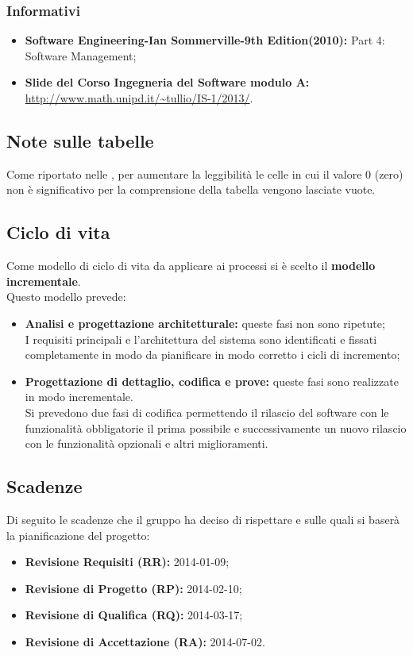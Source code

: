 		\subsubsection{Informativi}
		\label{RifInformativi}
			\begin{itemize}
				\item \textbf{Software Engineering-Ian Sommerville-9th Edition(2010):} Part 4: Software Management;
				
				\item \textbf{Slide del Corso Ingegneria del Software modulo A:} \url{http://www.math.unipd.it/~tullio/IS-1/2013/}.
			\end{itemize}
	\subsection{Note sulle tabelle}
	\label{NoteSulleTabelle}
		Come riportato nelle \NdP, per aumentare la leggibilità le celle in cui il valore 0 (zero) non è significativo per la comprensione della tabella vengono lasciate vuote.
	
	\subsection{Ciclo di vita}
	\label{CicloDiVita}
		Come modello di ciclo di vita da applicare ai processi si è scelto il \textbf{modello incrementale}.\\
		Questo modello prevede:
		\begin{itemize}
			\item \textbf{Analisi e progettazione architetturale:} queste fasi non sono ripetute;\\
			I requisiti principali e l'architettura del sistema sono identificati e fissati completamente in modo da pianificare in modo corretto i cicli di incremento;
			
			\item \textbf{Progettazione di dettaglio, codifica e prove:} queste fasi sono realizzate in modo incrementale.\\
			Si prevedono due fasi di codifica permettendo il rilascio del software con le funzionalità obbligatorie il prima possibile e successivamente un nuovo rilascio con le funzionalità opzionali e altri miglioramenti.
		\end{itemize}			
	
	\subsection{Scadenze}
	\label{Scadenze}
		Di seguito le scadenze che il gruppo \authorName{} ha deciso di rispettare e sulle quali si baserà la pianificazione del progetto:
		\begin{itemize}
			\item \textbf{Revisione Requisiti (RR):} 2014-01-09;
			\item \textbf{Revisione di Progetto (RP):} 2014-02-10;
			\item \textbf{Revisione di Qualifica (RQ):} 2014-03-17;
			\item \textbf{Revisione di Accettazione (RA):} 2014-07-02.
		\end{itemize}
